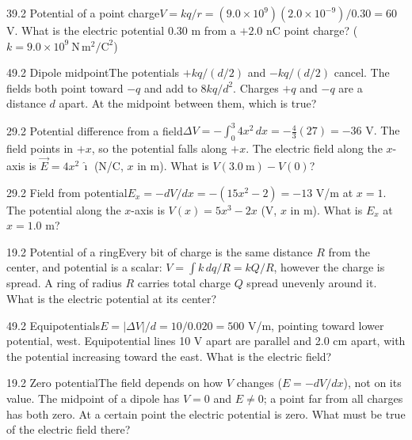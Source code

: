 \documentclass[11pt]{article}
\begin{document}
\begin{q}{3}{9.2 Potential of a point charge}{$V = kq/r = (9.0\times10^9)(2.0\times10^{-9})/0.30 = 60$ V.}
What is the electric potential 0.30 m from a $+2.0$ nC point charge? ($k = 9.0\times10^9\ \mathrm{N\,m^2/C^2}$)
\end{q}
\begin{q}{4}{9.2 Dipole midpoint}{The potentials $+kq/(d/2)$ and $-kq/(d/2)$ cancel. The fields both point toward $-q$ and add to $8kq/d^2$.}
Charges $+q$ and $-q$ are a distance $d$ apart. At the midpoint between them, which is true?
\end{q}
\begin{q}{2}{9.2 Potential difference from a field}{$\Delta V = -\int_0^3 4x^2\,dx = -\tfrac43(27) = -36$ V. The field points in $+x$, so the potential falls along $+x$.}
The electric field along the $x$-axis is $\vec E = 4x^2\,\hat\imath$ (N/C, $x$ in m). What is $V(3.0\ \mathrm{m}) - V(0)$?
\end{q}
\begin{q}{2}{9.2 Field from potential}{$E_x = -dV/dx = -(15x^2 - 2) = -13$ V/m at $x = 1$.}
The potential along the $x$-axis is $V(x) = 5x^3 - 2x$ (V, $x$ in m). What is $E_x$ at $x = 1.0$ m?
\end{q}
\begin{q}{1}{9.2 Potential of a ring}{Every bit of charge is the same distance $R$ from the center, and potential is a scalar: $V = \int k\,dq/R = kQ/R$, however the charge is spread.}
A ring of radius $R$ carries total charge $Q$ spread unevenly around it. What is the electric potential at its center?
\end{q}
\begin{q}{4}{9.2 Equipotentials}{$E = |\Delta V|/d = 10/0.020 = 500$ V/m, pointing toward lower potential, west.}
Equipotential lines 10 V apart are parallel and 2.0 cm apart, with the potential increasing toward the east. What is the electric field?
\end{q}
\begin{q}{1}{9.2 Zero potential}{The field depends on how $V$ changes ($E = -dV/dx$), not on its value. The midpoint of a dipole has $V = 0$ and $E \ne 0$; a point far from all charges has both zero.}
At a certain point the electric potential is zero. What must be true of the electric field there?
\end{q}
\end{document}
